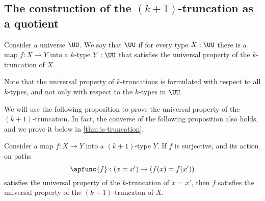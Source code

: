 \subsection{The construction of the  \texorpdfstring{$(k+1)$}{(k+1)}-truncation as a quotient}

\begin{defn}
  Consider a universe $\UU$. We say that $\UU$  if for every type $X:\UU$ there is a map $f:X\to Y$ into a $k$-type $Y:\UU$ that satisfies the universal property of the $k$-truncation of $X$.
\end{defn}

\begin{rmk}
  Note that the universal property of $k$-truncations is formulated with respect to all $k$-types, and not only with respect to the $k$-types in $\UU$.
\end{rmk}

We will use the following proposition to prove the universal property of the $(k+1)$-truncation. In fact, the converse of the following proposition also holds, and we prove it below in \cref{thm:is-truncation}.

\begin{prp}\label{prp:is-truncation}
  Consider a map $f:X\to Y$ into a $(k+1)$-type $Y$. If $f$ is surjective, and its action on paths
  \begin{equation*}
    \apfunc{f}:(x=x')\to(f(x)=f(x'))
  \end{equation*}
  satisfies the universal property of the $k$-truncation of $x=x'$, then $f$ satisfies the universal property of the $(k+1)$-truncaton of $X$.
\end{prp}

